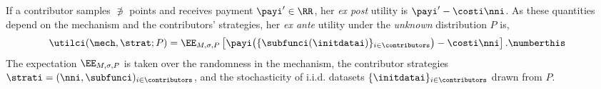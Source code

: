  \hspace{-0.1in}
If a contributor samples $\nni$ points and receives payment $\payi' \in \RR$, her \emph{ex post} utility is $\payi' - \costi \nni$.
As these quantities depend on the mechanism and the contributors' strategies,
her \emph{ex ante} utility under the \emph{unknown} distribution $P$ is,
\begin{align*}
    \utilci(\mech, \strat; P)
        &= \EE_{M, \sigma, P}\left[ \payi\big(\{\subfunci(\initdatai)\}_{i\in\contributors}\big)
                - \costi \nni\right].
          \numberthis  \label{eqn:utilc}
\end{align*}
The expectation $\EE_{M, \sigma, P}$ is taken over the randomness in the mechanism, the contributor strategies $\strati = (\nni, \subfunci)_{i \in \contributors}$, and the stochasticity of i.i.d. datasets $\{\initdatai\}_{i \in \contributors}$ drawn from $P$.



